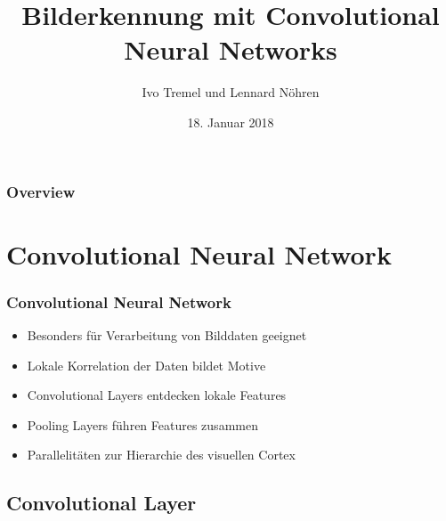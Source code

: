 \documentclass{beamer}
\title[Convolutional Neural Networks]{Bilderkennung mit Convolutional Neural Networks} %
\author{Ivo Tremel und Lennard Nöhren} %
\institute[CHI] %
{
Leibniz Universität Hannover \\ %
\medskip
}
\date{18. Januar 2018} %
\begin{document}
\begin{frame}
\titlepage %
\end{frame}

\begin{frame}
\frametitle{Overview} %
\tableofcontents %
\end{frame}


\section{Convolutional Neural Network} %
\begin{frame}
	\frametitle{Convolutional Neural Network}
	\begin{itemize}
		\item Besonders für Verarbeitung von Bilddaten geeignet
		\item Lokale Korrelation der Daten bildet Motive
		\item Convolutional Layers entdecken lokale Features
		\item Pooling Layers führen Features zusammen
		\item Parallelitäten zur Hierarchie des visuellen Cortex
	\end{itemize}
\end{frame}

\subsection{Convolutional Layer} %
\end{document}
